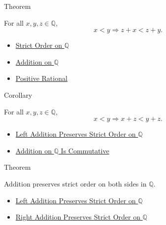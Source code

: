 \begin{theorembox}{Theorem}
\begin{theorem}
\label{thm:left-addition-preserves-strict-order-on-q}
For all $x,y,z\in\mathbb{Q}$,
\[
x<y \Longrightarrow z+x<z+y.
\]
\end{theorem}
\end{theorembox}

\begin{dependencies}
\begin{itemize}
  \item \hyperref[def:strict-order-on-q]{Strict Order on $\mathbb{Q}$}
  \item \hyperref[def:addition-on-q-classes]{Addition on $\mathbb{Q}$}
  \item \hyperref[def:positive-rational]{Positive Rational}
\end{itemize}
\end{dependencies}

\begin{corollarybox}{Corollary}
\begin{corollary}
\label{cor:right-addition-preserves-strict-order-on-q}
For all $x,y,z\in\mathbb{Q}$,
\[
x<y \Longrightarrow x+z<y+z.
\]
\end{corollary}
\end{corollarybox}

\begin{dependencies}
\begin{itemize}
  \item \hyperref[thm:left-addition-preserves-strict-order-on-q]{Left Addition Preserves Strict Order on $\mathbb{Q}$}
  \item \hyperref[thm:addition-on-q-commutative]{Addition on $\mathbb{Q}$ Is Commutative}
\end{itemize}
\end{dependencies}

\begin{theorembox}{Theorem}
\begin{theorem}
\label{thm:addition-preserves-strict-order-on-q}
Addition preserves strict order on both sides in $\mathbb{Q}$.
\end{theorem}
\end{theorembox}

\begin{dependencies}
\begin{itemize}
  \item \hyperref[thm:left-addition-preserves-strict-order-on-q]{Left Addition Preserves Strict Order on $\mathbb{Q}$}
  \item \hyperref[cor:right-addition-preserves-strict-order-on-q]{Right Addition Preserves Strict Order on $\mathbb{Q}$}
\end{itemize}
\end{dependencies}

